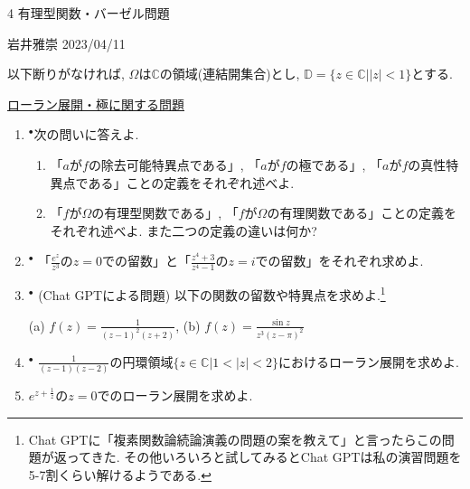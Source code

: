 \documentclass[dvipdfmx,a4paper,11pt]{article}
\newcommand{\C}{\mathbb{C}}
\newcommand{\D}{\mathbb{D}}
\theoremstyle{definition}
\begin{document}
\newpage


\begin{center}
{\Large 4 有理型関数・バーゼル問題}
\end{center}

\begin{flushright}
 岩井雅崇 2023/04/11
\end{flushright}
以下断りがなければ, $\Omega$は$\C$の領域(連結開集合)とし, $\D=\{z \in \C |  |z| <1\}$とする. 

\vspace{12pt}
\hspace{-24pt}\underline{ローラン展開・極に関する問題}

\begin{enumerate}[label=\textbf{問}4.\arabic*]

\item $^{\bullet}$次の問いに答えよ. %
   \begin{enumerate}
 \setlength{\parskip}{0cm} 
  \setlength{\itemsep}{0cm} 
  \item 「$a$が$f$の除去可能特異点である」, 「$a$が$f$の極である」, 「$a$が$f$の真性特異点である」ことの定義をそれぞれ述べよ.
  \item 「$f$が$\Omega$の有理型関数である」, 「$f$が$\Omega$の有理関数である」ことの定義をそれぞれ述べよ. また二つの定義の違いは何か?　%
    \end{enumerate}
    
 
\item $^{\bullet}$ 「$\frac{e^z}{z^3}$の$z=0$での留数」と「$\frac{z^4 + 3}{z^4 -1}$の$z=i$での留数」をそれぞれ求めよ.


\item $^{\bullet}$ (Chat GPTによる問題) 以下の関数の留数や特異点を求めよ.\footnote{Chat GPTに「複素関数論続論演義の問題の案を教えて」と言ったらこの問題が返ってきた. その他いろいろと試してみるとChat GPTは私の演習問題を5-7割くらい解けるようである. }

(a) $f(z) = \frac{1}{(z-1)^2(z+2)}$,  
(b) $f(z) = \frac{\sin z}{z^3(z-\pi)^2}$

\item  $^{\bullet}$ $\frac{1}{(z-1)(z-2)}$の円環領域$\{ z\in \C | 1 < |z| < 2\}$におけるローラン展開を求めよ.

\item $e^{z + \frac{1}{z}}$の$z=0$でのローラン展開を求めよ.



\end{enumerate}
\end{document}
